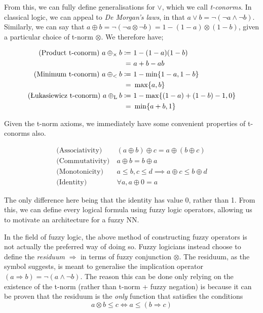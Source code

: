 From this, we can fully define generalisations for $\lor$, which we call \textit{t-conorms}. In classical logic, we can appeal to \textit{De Morgan's laws}, in that $a \lor b = \lnot (\lnot a \land \lnot b)$. Similarly, we can say that $a \oplus b = \lnot(\lnot a \otimes \lnot b) = 1 - (1 - a) \otimes (1 - b)$, given a particular choice of t-norm $\otimes$. We therefore have;

$$
\begin{aligned}
    \text{(Product t-conorm)}\ a {\mspace{4mu}\oplus_\times\mspace{4mu}} b \coloneqq &\ 1 - (1-a)(1-b) \\
    = &\ a + b - ab \\
    \text{(Minimum t-conorm)}\ a {\mspace{4mu}\oplus_<\mspace{4mu}} b \coloneqq &\ 1 - \min\{1-a,1-b\} \\
    = &\ \max\{a, b\} \\
    \text{(Łukasiewicz t-conorm)}\ a {\mspace{4mu}\oplus_\text{L}\mspace{4mu}} b \coloneqq &\ 1 - \max\{(1-a)+(1-b)-1,0\} \\
    = &\ \min\{a+b, 1\}
\end{aligned}
$$

Given the t-norm axioms, we immediately have some convenient properties of t-conorms also.

$$
\begin{aligned}
\text{(Associativity)}&\ (a \oplus b) \oplus c = a \oplus (b \oplus c) \\
\text{(Commutativity)}&\ a \oplus b = b \oplus a \\
\text{(Monotonicity)}&\ a \leq b, c \leq d \implies a \oplus c \leq b \oplus d \\
\text{(Identity)}&\ \forall a, a \oplus 0 = a
\end{aligned}
$$

The only difference here being that the identity has value 0, rather than 1. From this, we can define every logical formula using fuzzy logic operators, allowing us to motivate an architecture for a fuzzy NN.

In the field of fuzzy logic, the above method of constructing fuzzy operators is not actually the preferred way of doing so. Fuzzy logicians instead choose to define the \textit{residuum} $\Rightarrow$ in terms of fuzzy conjunction $\otimes$. The residuum, as the symbol suggests, is meant to generalise the implication operator $(a \Rightarrow b) = \lnot(a \land \lnot b)$. The reason this can be done only relying on the existence of the t-norm (rather than t-norm + fuzzy negation) is because it can be proven that the residuum is the \textit{only} function that satisfies the conditions
$$a \otimes b \leq c \iff a \leq (b \Rightarrow c)$$

